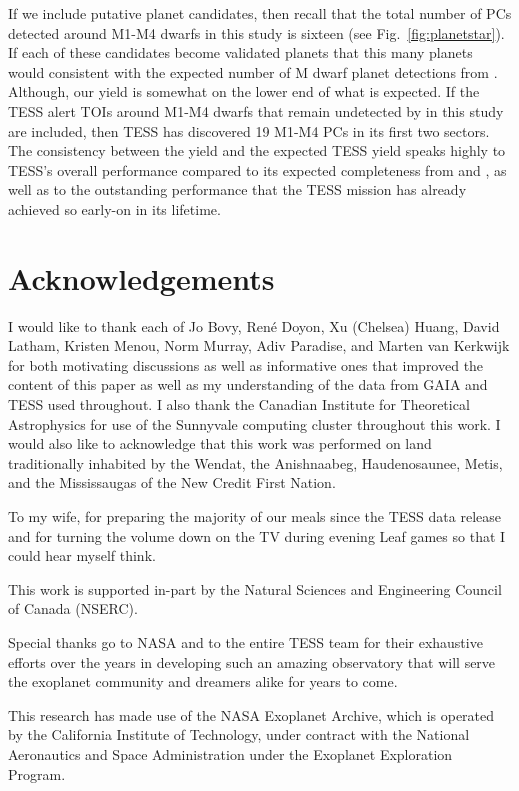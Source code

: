 If we include putative planet candidates, then recall that the
total number of PCs detected around M1-M4 dwarfs in this study is sixteen (see
Fig.~\ref{fig:planetstar}). If each of these candidates become validated planets that this
many planets would consistent with the expected number of M dwarf planet detections from
\cite{ballard18}. Although, our yield is somewhat on the lower end of what is expected.
If the TESS alert TOIs around M1-M4 dwarfs that remain undetected by \pipeline{} in this study are
included, then TESS has discovered 19 M1-M4 PCs in its first two sectors.
The consistency between the \pipeline{} yield and the expected TESS yield speaks highly to TESS's
overall performance compared to its expected completeness from \cite{sullivan15} and
\cite{ballard18}, as well as to the outstanding performance that the TESS mission has
already achieved so early-on in its lifetime.

\iffalse
\section*{Acknowledgements}
I would like to thank each of
Jo Bovy,
Ren\'e Doyon,
Xu (Chelsea) Huang,
David Latham,
Kristen Menou,
Norm Murray,
Adiv Paradise, and
Marten van Kerkwijk
for both motivating discussions as well as informative ones that improved the content of this
paper as well as my understanding of the data from GAIA and TESS used throughout.
I also thank the Canadian Institute for Theoretical Astrophysics for use of the Sunnyvale
computing cluster throughout this work. 
I would also like to acknowledge that this
work was performed on land traditionally inhabited by the
Wendat, the Anishnaabeg, Haudenosaunee, Metis, and the
Mississaugas of the New Credit First Nation.

To my wife, for preparing the majority of our meals since the TESS data release and
for turning the volume down on the TV during evening Leaf games so that I could hear myself
think. 

This work is supported in-part by the Natural Sciences
and Engineering Council of Canada (NSERC).

Special thanks go to NASA and to the entire TESS team for their exhaustive efforts over the
years in developing such an amazing observatory that will serve the exoplanet community
and dreamers alike for years to come.

This research has made use of the NASA Exoplanet Archive, which is operated by the California
Institute of Technology, under contract with the National Aeronautics and Space Administration
under the Exoplanet Exploration Program.


